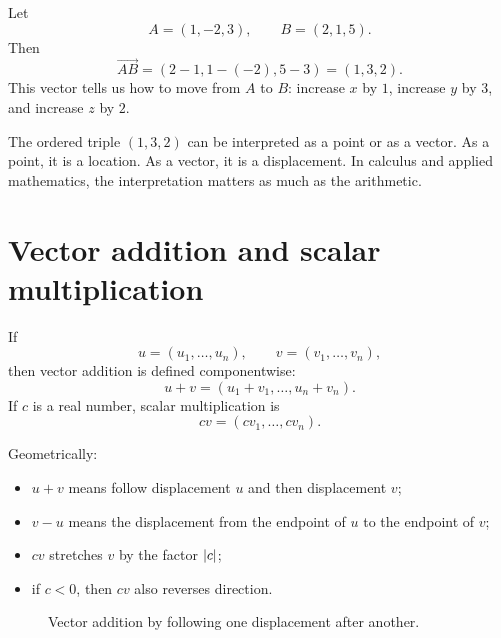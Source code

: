 \begin{examplebox}[title={Example 3.1: A displacement vector in space}]
Let
\[
  A=(1,-2,3), \qquad B=(2,1,5).
\]
Then
\[
  \overrightarrow{AB}=(2-1,1-(-2),5-3)=(1,3,2).
\]
This vector tells us how to move from $A$ to $B$: increase $x$ by $1$, increase $y$ by $3$, and increase $z$ by $2$.
\end{examplebox}

\begin{notebox}[title={Point versus vector}]
The ordered triple $(1,3,2)$ can be interpreted as a point or as a vector. As a point, it is a location. As a vector, it is a displacement. In calculus and applied mathematics, the interpretation matters as much as the arithmetic.
\end{notebox}

\section{Vector addition and scalar multiplication}

If
\[
  u=(u_1,\ldots,u_n), \qquad v=(v_1,\ldots,v_n),
\]
then vector addition is defined componentwise:
\[
  u+v=(u_1+v_1,\ldots,u_n+v_n).
\]
If $c$ is a real number, scalar multiplication is
\[
  cv=(cv_1,\ldots,cv_n).
\]

Geometrically:
\begin{itemize}
\item $u+v$ means follow displacement $u$ and then displacement $v$;
\item $v-u$ means the displacement from the endpoint of $u$ to the endpoint of $v$;
\item $cv$ stretches $v$ by the factor $\left\lvert c\right\rvert$;
\item if $c<0$, then $cv$ also reverses direction.
\end{itemize}

\begin{figure}[H]
\centering
{}
\caption{Vector addition by following one displacement after another.}
\end{figure}


